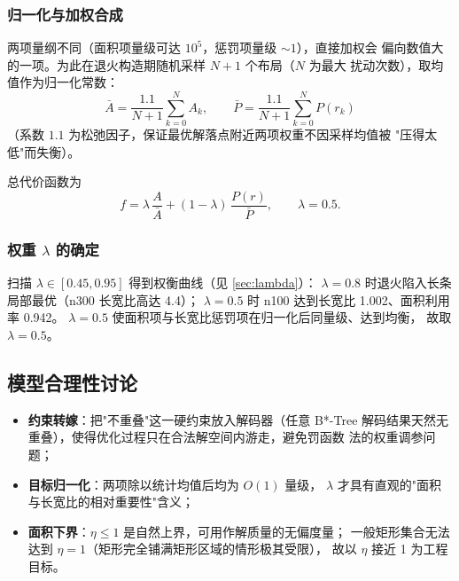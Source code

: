 \documentclass[12pt,a4paper]{article}
\begin{document}
\subsubsection{归一化与加权合成}

两项量纲不同（面积项量级可达 $10^5$，惩罚项量级 $\sim 1$），直接加权会
偏向数值大的一项。为此在退火构造期随机采样 $N+1$ 个布局（$N$ 为最大
扰动次数），取均值作为归一化常数：
\begin{equation}
\bar A = \frac{1.1}{N+1} \sum_{k=0}^{N} A_k, \qquad
\bar P = \frac{1.1}{N+1} \sum_{k=0}^{N} P(r_k)
\end{equation}
（系数 $1.1$ 为松弛因子，保证最优解落点附近两项权重不因采样均值被
"压得太低"而失衡）。

总代价函数为
\begin{equation}
\label{eq:cost}
f = \lambda\, \frac{A}{\bar A} + (1-\lambda)\, \frac{P(r)}{\bar P},
\qquad \lambda = 0.5.
\end{equation}

\subsubsection{权重 $\lambda$ 的确定}

扫描 $\lambda \in [0.45, 0.95]$ 得到权衡曲线（见 \ref{sec:lambda}）：
$\lambda = 0.8$ 时退火陷入长条局部最优（n300 长宽比高达 4.4）；
$\lambda = 0.5$ 时 n100 达到长宽比 1.002、面积利用率 0.942。
$\lambda = 0.5$ 使面积项与长宽比惩罚项在归一化后同量级、达到均衡，
故取 $\lambda = 0.5$。

\subsection{模型合理性讨论}

\begin{itemize}
    \item \textbf{约束转嫁}：把"不重叠"这一硬约束放入解码器（任意 B*-Tree
    解码结果天然无重叠），使得优化过程只在合法解空间内游走，避免罚函数
    法的权重调参问题；
    \item \textbf{目标归一化}：两项除以统计均值后均为 $O(1)$ 量级，
    $\lambda$ 才具有直观的"面积与长宽比的相对重要性"含义；
    \item \textbf{面积下界}：$\eta \le 1$ 是自然上界，可用作解质量的无偏度量；
    一般矩形集合无法达到 $\eta = 1$（矩形完全铺满矩形区域的情形极其受限），
    故以 $\eta$ 接近 1 为工程目标。
\end{itemize}

\end{document}
